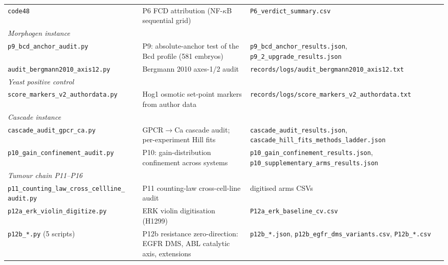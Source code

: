 \documentclass[11pt]{article}
\begin{document}
\begin{longtable}{p{5.6cm} p{6.6cm} p{3.6cm}}
\texttt{code48} & P6 FCD attribution (NF-$\kappa$B sequential grid) & \texttt{P6\_\allowbreak{}verdict\_\allowbreak{}summary.csv} \\
\multicolumn{3}{l}{\emph{Morphogen instance}}\\
\texttt{p9\_\allowbreak{}bcd\_\allowbreak{}anchor\_\allowbreak{}audit.py} & P9: absolute-anchor test of the Bcd profile (581 embryos) & \texttt{p9\_\allowbreak{}bcd\_\allowbreak{}anchor\_\allowbreak{}results.json}, \texttt{p9\_\allowbreak{}2\_\allowbreak{}upgrade\_\allowbreak{}results.json} \\
\texttt{audit\_\allowbreak{}bergmann2010\_\allowbreak{}axis12.py} & Bergmann 2010 axes-1/2 audit & \texttt{records/\allowbreak{}logs/\allowbreak{}audit\_\allowbreak{}bergmann2010\_\allowbreak{}axis12.txt} \\
\multicolumn{3}{l}{\emph{Yeast positive control}}\\
\texttt{score\_\allowbreak{}markers\_\allowbreak{}v2\_\allowbreak{}authordata.py} & Hog1 osmotic set-point markers from author data & \texttt{records/\allowbreak{}logs/\allowbreak{}score\_\allowbreak{}markers\_\allowbreak{}v2\_\allowbreak{}authordata.txt} \\
\multicolumn{3}{l}{\emph{Cascade instance}}\\
\texttt{cascade\_\allowbreak{}audit\_\allowbreak{}gpcr\_\allowbreak{}ca.py} & GPCR$\to$Ca cascade audit; per-experiment Hill fits & \texttt{cascade\_\allowbreak{}audit\_\allowbreak{}results.json}, \texttt{cascade\_\allowbreak{}hill\_\allowbreak{}fits\_\allowbreak{}methods\_\allowbreak{}ladder.json} \\
\texttt{p10\_\allowbreak{}gain\_\allowbreak{}confinement\_\allowbreak{}audit.py} & P10: gain-distribution confinement across systems & \texttt{p10\_\allowbreak{}gain\_\allowbreak{}confinement\_\allowbreak{}results.json}, \texttt{p10\_\allowbreak{}supplementary\_\allowbreak{}arms\_\allowbreak{}results.json} \\
\multicolumn{3}{l}{\emph{Tumour chain P11--P16}}\\
\texttt{p11\_\allowbreak{}counting\_\allowbreak{}law\_\allowbreak{}cross\_\allowbreak{}cellline\_\allowbreak{} audit.py} & P11 counting-law cross-cell-line audit & digitised arms CSVs \\
\texttt{p12a\_\allowbreak{}erk\_\allowbreak{}violin\_\allowbreak{}digitize.py} & ERK violin digitisation (H1299) & \texttt{P12a\_\allowbreak{}erk\_\allowbreak{}baseline\_\allowbreak{}cv.csv} \\
\texttt{p12b\_\allowbreak{}*.py} (5 scripts) & P12b resistance zero-direction: EGFR DMS, ABL catalytic axis, extensions & \texttt{p12b\_\allowbreak{}*.json}, \texttt{p12b\_\allowbreak{}egfr\_\allowbreak{}dms\_\allowbreak{}variants.csv}, \texttt{P12b\_\allowbreak{}*.csv} \\

\end{longtable}
\end{document}
